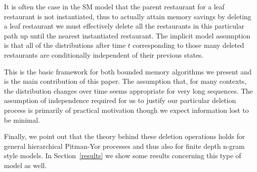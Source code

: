 It is often the case in the SM model that the parent restaurant for a leaf restaurant is not instantiated, thus to actually attain memory savings by deleting a leaf restaurant we must effectively delete all the restaurants in this particular path up until the nearest instantiated restaurant.  The implicit model assumption is that all of the distributions after time $t$ corresponding to those many deleted restaurants are conditionally independent of their previous states.

This is the basic framework for both bounded memory algorithms we present and is the main contribution of this paper.  The assumption that, for many contexts, the distribution changes over time seems appropriate for very long sequences. The assumption of independence required for us to justify our particular deletion process is primarily of practical motivation though we expect information lost to be minimal. 

Finally, we point out that the theory behind these deletion operations holds for general hierarchical Pitman-Yor processes and thus also for finite depth n-gram style models.  In Section~\ref{results} we show some results concerning this type of model as well.
